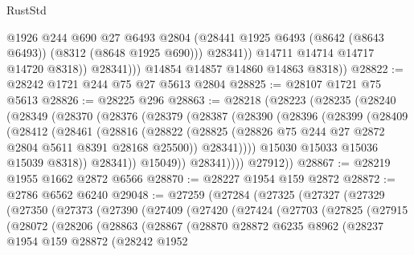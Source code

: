 \begin{lexlean}{RustStd}
\begin{coremodule}
                      @1926
                      @244
                      @690
                      @27
                      @6493
                      @2804
                      (@28441 @1925 @6493 (@8642 (@8643 @6493)) (@8312 (@8648 @1925 @690)))
                      @28341))
                  @14711
                  @14714
                  @14717
                  @14720
                  @8318))
              @28341)))
        @14854
        @14857
        @14860
        @14863
        @8318))
@28822 := @28242 @1721 @244 @75 @27 @5613 @2804
@28825 := @28107 @1721 @75 @5613
@28826 := @28225 @296
@28863 := @28218
    (@28223
      (@28235
        (@28240
          (@28349
            (@28370
              (@28376
                (@28379
                  (@28387
                    (@28390
                      (@28396
                        (@28399
                          (@28409
                            (@28412
                              (@28461
                                (@28816
                                  (@28822
                                    (@28825
                                      (@28826 @75 @244 @27 @2872 @2804 @5611 @8391 @28168 @25500))
                                    @28341))))
                            @15030
                            @15033
                            @15036
                            @15039
                            @8318))
                        @28341))
                    @15049))
                @28341))))
        @27912))
@28867 := @28219 @1955 @1662 @2872 @6566
@28870 := @28227 @1954 @159 @2872
@28872 := @2786 @6562 @6240
@29048 := @27259
    (@27284
      (@27325
        (@27327
          (@27329
            (@27350
              (@27373
                (@27390
                  (@27409
                    (@27420
                      (@27424
                        (@27703
                          (@27825
                            (@27915
                              (@28072
                                (@28206
                                  (@28863
                                    (@28867
                                      (@28870
                                        @28872
                                        @6235
                                        @8962
                                        (@28237
                                          @1954
                                          @159
                                          @28872
                                          (@28242
                                            @1952

\end{coremodule}
\end{lexlean}
